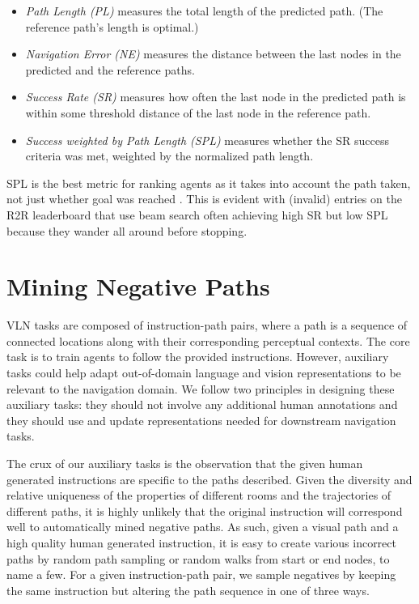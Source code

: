 \documentclass[10pt,twocolumn,letterpaper]{article}
\begin{document}
\begin{itemize}
    \setlength \itemsep{0em}
    \item \textit{Path Length (PL)} measures the total length of the predicted path. (The reference path's length is optimal.)
    \item \textit{Navigation Error (NE)} measures the distance between the last nodes in the predicted and the reference paths.
    \item \textit{Success Rate (SR)} measures how often the last node in the predicted path is within some threshold distance  of the last node in the reference path.
    \item \textit{Success weighted by Path Length (SPL)} \cite{Anderson:2018:Evaluation} measures whether the SR success criteria was met, weighted by the normalized path length.
\end{itemize}

\noindent
SPL is the best metric for ranking agents as it takes into account the path taken, not just whether goal was reached \cite{Anderson:2018:Evaluation}. This is evident with (invalid) entries on the R2R leaderboard that use beam search often achieving high SR but low SPL because they wander all around before stopping. 
\section{Mining Negative Paths}
\label{sec:negative_paths}

VLN tasks are composed of instruction-path pairs, where a path is a sequence of connected locations along with their corresponding perceptual contexts. The core task is to train agents to follow the provided instructions. However, auxiliary tasks could help adapt out-of-domain language and vision representations to be relevant to the navigation domain. We follow two principles in designing these auxiliary tasks: they should not involve any additional human annotations and they should use and update representations needed for downstream navigation tasks.

The crux of our auxiliary tasks is the observation that the given human generated instructions are specific to the paths described. Given the diversity and relative uniqueness of the properties of different rooms and the trajectories of different paths, it is highly unlikely that the original instruction will correspond well to automatically mined negative paths. As such, given a visual path and a high quality human generated instruction, it is easy to create various incorrect paths by random path sampling or random walks from start or end nodes, to name a few. For a given instruction-path pair, we sample negatives by keeping the same instruction but altering the path sequence in one of three ways.
\end{document}
